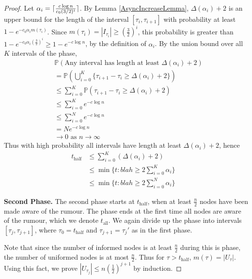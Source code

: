 \begin{proof}
	Let $\alpha_i = \lceil\frac{c \log n}{c_0 (3/2)^i}\rceil$. %
	By Lemma \ref{AsyncIncreaseLemma}, $\Delta(\alpha_i) + 2$ is an upper bound for the length of the interval $[\tau_i, \tau_{i+1}]$ 
	with probability at least $1 - e^{-c_0\alpha_i m(\tau_i)}$. %
	Since $m(\tau_i) = |I_{\tau_i}| \geq (\frac{3}{2})^i$, this probability is greater than $1 - e^{-c_0\alpha_i (\frac{3}{2})^i} \geq 1 - e^{-c \log n}$, by the definition of $\alpha_i$. By the union bound over all $K$ intervals of the phase,
	\begin{align*}
		& \mathbb{P}(\text{Any interval has length at least } \Delta(\alpha_i) + 2) \\
		&= \mathbb{P}(\bigcup_{i=0}^K \{\tau_{i+1} - \tau_i \geq \Delta(\alpha_i) + 2\}) \\
		&\leq \sum_{i=0}^K \mathbb{P}(\tau_{i+1} - \tau_i \geq \Delta(\alpha_i) + 2) \\
		&\leq \sum_{i=0}^K e^{-c \log n} \\
		&\leq \sum_{i=0}^N e^{-c \log n} 
		\\
		&= N e^{-c \log n} \\
		&\to 0 \text { as } n \to \infty
	\end{align*}
	Thus with high probability all intervals have length at least $\Delta(\alpha_i) + 2$, hence
	\begin{align*}
		t_\text{half} &\leq \sum_{i=0}^K (\Delta(\alpha_i) + 2) \\
		&\leq \min \{t : blah \geq 2 \sum_{i=0}^K \alpha_i \} \\ %
		&\leq \min \{t : blah \geq 2 \sum_{i=0}^N \alpha_i \} & %
	\end{align*}

	\textbf{Second Phase.} The second phase starts at $t_\text{half}$, when at least $\frac{n}{2}$ nodes have been made aware of the rumour. The phase ends at the first time all nodes are aware of the rumour, which we denote $t_\text{all}$. We again divide up the phase into intervals $[\tau_j, \tau_{j+1}]$, where $\tau_0 = t_\text{half}$ and $\tau_{j+1} = \tau_j'$ as in the first phase.

	Note that since the number of informed nodes is at least $\frac{n}{2}$ during this is phase, the number of uniformed nodes is at most $\frac{n}{2}$. Thus for $\tau > t_\text{half}$, $m(\tau) = |U_\tau|$. Using this fact, we prove $|U_{\tau_j}| \leq n(\frac{1}{2})^{j+1}$ by induction.


\end{proof}
